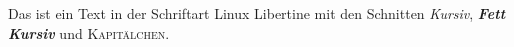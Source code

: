 \documentclass{article}
\begin{document}
Das ist ein Text in der Schriftart Linux Libertine mit den Schnitten
\textit{Kursiv}, \textbf{\textit{Fett Kursiv}} und \textsc{Kapitälchen}.
\end{document}
